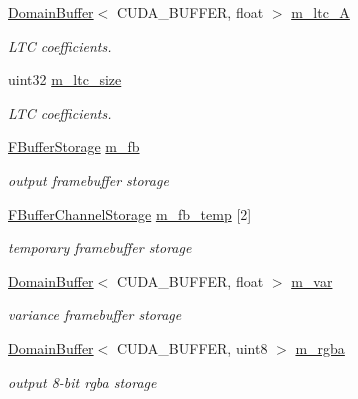 \begin{DoxyCompactItemize}
\mbox{\label{struct_renderer_a00f5beedfa7d1587067dc320d1ffec43}} 
\hyperlink{class_domain_buffer}{Domain\+Buffer}$<$ C\+U\+D\+A\+\_\+\+B\+U\+F\+F\+ER, float $>$ \hyperlink{struct_renderer_a00f5beedfa7d1587067dc320d1ffec43}{m\+\_\+ltc\+\_\+A}
\begin{DoxyCompactList}\small\item\em L\+TC coefficients. \end{DoxyCompactList}\item 
\mbox{\label{struct_renderer_a3a91347458db5c4dd22a76c31b25a4b5}} 
uint32 \hyperlink{struct_renderer_a3a91347458db5c4dd22a76c31b25a4b5}{m\+\_\+ltc\+\_\+size}
\begin{DoxyCompactList}\small\item\em L\+TC coefficients. \end{DoxyCompactList}\item 
\mbox{\label{struct_renderer_a5d0765cca876a604a920f7ab1c529f4d}} 
\hyperlink{struct_f_buffer_storage}{F\+Buffer\+Storage} \hyperlink{struct_renderer_a5d0765cca876a604a920f7ab1c529f4d}{m\+\_\+fb}
\begin{DoxyCompactList}\small\item\em output framebuffer storage \end{DoxyCompactList}\item 
\mbox{\label{struct_renderer_a317f4023bd228a22e9d0b1acd5b27f88}} 
\hyperlink{struct_f_buffer_channel_storage}{F\+Buffer\+Channel\+Storage} \hyperlink{struct_renderer_a317f4023bd228a22e9d0b1acd5b27f88}{m\+\_\+fb\+\_\+temp} \mbox{[}2\mbox{]}
\begin{DoxyCompactList}\small\item\em temporary framebuffer storage \end{DoxyCompactList}\item 
\mbox{\label{struct_renderer_aaca64366dcfc296fb22bb08c3ee33b99}} 
\hyperlink{class_domain_buffer}{Domain\+Buffer}$<$ C\+U\+D\+A\+\_\+\+B\+U\+F\+F\+ER, float $>$ \hyperlink{struct_renderer_aaca64366dcfc296fb22bb08c3ee33b99}{m\+\_\+var}
\begin{DoxyCompactList}\small\item\em variance framebuffer storage \end{DoxyCompactList}\item 
\mbox{\label{struct_renderer_a61d53d8197cf2755727e50ff5f67d1a0}} 
\hyperlink{class_domain_buffer}{Domain\+Buffer}$<$ C\+U\+D\+A\+\_\+\+B\+U\+F\+F\+ER, uint8 $>$ \hyperlink{struct_renderer_a61d53d8197cf2755727e50ff5f67d1a0}{m\+\_\+rgba}
\begin{DoxyCompactList}\small\item\em output 8-\/bit rgba storage \end{DoxyCompactList}\end{DoxyCompactItemize}



